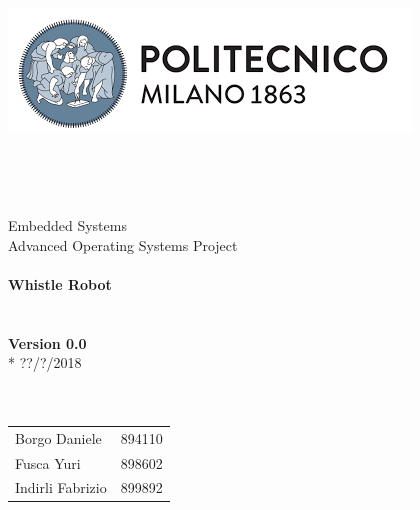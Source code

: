 \begin{titlepage}
	\begin{center}
		\includegraphics[scale=0.5]{files/images/PolimiLogo}
		\ \\ \ \\ \ \\ \ \\ \ \\
		\huge Embedded Systems \\
		\huge Advanced Operating Systems Project
		\ \\ \ \\
		\textbf{Whistle Robot}
		\ \\ \ \\ \ \\
		\textbf{Version 0.0}\\*
		??/?/2018
		\ \\ \ \\ \ \\
		\begin{tabular}{ l c }
			Borgo Daniele & 894110\\
			Fusca Yuri & 898602 \\
			Indirli Fabrizio & 899892 \\
		\end{tabular}
	\end{center}
\end{titlepage}
